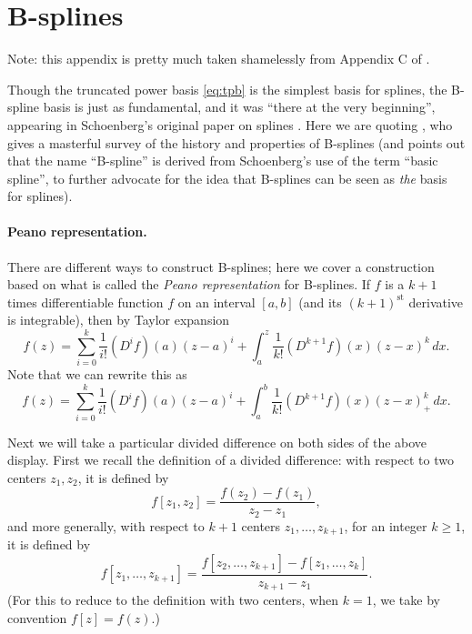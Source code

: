 \documentclass{article}
\begin{document}
\clearpage
\appendix

\section{B-splines}
\label{app:bs}

Note: this appendix is pretty much taken shamelessly from Appendix C of 
\citet{tibshirani2022divided}.

Though the truncated power basis \eqref{eq:tpb} is the simplest basis for
splines, the B-spline basis is just as fundamental, and it was ``there at the 
very beginning'', appearing in Schoenberg's original paper on splines
\citep{schoenberg1946contributions1}. Here we are quoting
\citet{deboor1976splines}, who gives a masterful survey of the history and
properties of B-splines (and points out that the name ``B-spline'' is derived
from Schoenberg's use of the term ``basic spline'', to further advocate for the
idea that B-splines can be seen as \emph{the} basis for splines).

\paragraph{Peano representation.}

\def\st{^{\text{st}}}

There are different ways to construct B-splines; here we cover a construction
based on what is called the \emph{Peano representation} for B-splines. If $f$ is
a $k+1$ times differentiable function $f$ on an interval $[a,b]$ (and its
$(k+1)\st$ derivative is integrable), then by Taylor expansion
\[
f(z) = \sum_{i=0}^k \frac{1}{i!} (D^i f)(a) (z-a)^i + 
\int_a^z \frac{1}{k!} (D^{k+1} f)(x) (z-x)^k \, dx.
\]
Note that we can rewrite this as
\begin{equation}
\label{eq:taylor}
f(z) = \sum_{i=0}^k \frac{1}{i!} (D^i f)(a) (z-a)^i + 
\int_a^b \frac{1}{k!} (D^{k+1} f)(x) (z-x)^k_+ \, dx. 
\end{equation}

Next we will take a particular divided difference on both sides of the above
display. First we recall the definition of a divided difference: with respect to
two centers $z_1,z_2$, it is defined by       
\[
f[z_1,z_2] =  \frac{f(z_2)-f(z_1)}{z_2-z_1},
\]
and more generally, with respect to $k+1$ centers $z_1,\dots,z_{k+1}$, for an
integer $k \geq 1$, it is defined by  
\[
f[z_1,\dots,z_{k+1}] = \frac{f[z_2,\dots,z_{k+1}] -
f[z_1,\dots,z_k]}{z_{k+1}-z_1}.
\]
(For this to reduce to the definition with two centers, when $k=1$, we take by 
convention $f[z]=f(z)$.)   
\end{document}
